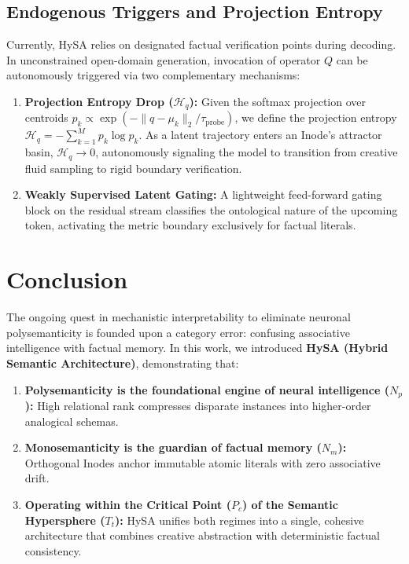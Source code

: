 \documentclass[10pt,twocolumn]{article}
\theoremstyle{definition}
\begin{document}
\subsection{Endogenous Triggers and Projection Entropy}
Currently, HySA relies on designated factual verification points during decoding. In unconstrained open-domain generation, invocation of operator $Q$ can be autonomously triggered via two complementary mechanisms:
\begin{enumerate}[leftmargin=*, itemsep=2.0pt]
    \item \textbf{Projection Entropy Drop ($\mathcal{H}_q$):} Given the softmax projection over centroids $p_k \propto \exp(-\|q - \mu_k\|_2 / \tau_{\mathrm{probe}})$, we define the projection entropy $\mathcal{H}_q = -\sum_{k=1}^M p_k \log p_k$. As a latent trajectory enters an Inode's attractor basin, $\mathcal{H}_q \to 0$, autonomously signaling the model to transition from creative fluid sampling to rigid boundary verification.
    \item \textbf{Weakly Supervised Latent Gating:} A lightweight feed-forward gating block on the residual stream classifies the ontological nature of the upcoming token, activating the metric boundary exclusively for factual literals.
\end{enumerate}

\section{Conclusion}

The ongoing quest in mechanistic interpretability to eliminate neuronal polysemanticity is founded upon a category error: confusing associative intelligence with factual memory. In this work, we introduced \textbf{HySA (Hybrid Semantic Architecture)}, demonstrating that:
\begin{enumerate}[leftmargin=*, itemsep=1.5pt]
    \item \textbf{Polysemanticity is the foundational engine of neural intelligence ($N_p$):} High relational rank compresses disparate instances into higher-order analogical schemas.
    \item \textbf{Monosemanticity is the guardian of factual memory ($N_m$):} Orthogonal Inodes anchor immutable atomic literals with zero associative drift.
    \item \textbf{Operating within the Critical Point ($P_c$) of the Semantic Hypersphere ($T_t$):} HySA unifies both regimes into a single, cohesive architecture that combines creative abstraction with deterministic factual consistency.
\end{enumerate}
\end{document}
